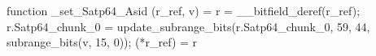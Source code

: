 function _set_Satp64_Asid (r_ref, v) = {
    r = __bitfield_deref(r_ref);
    r.Satp64_chunk_0 = update_subrange_bits(r.Satp64_chunk_0, 59, 44, subrange_bits(v, 15, 0));
    (*r_ref) = r
}
